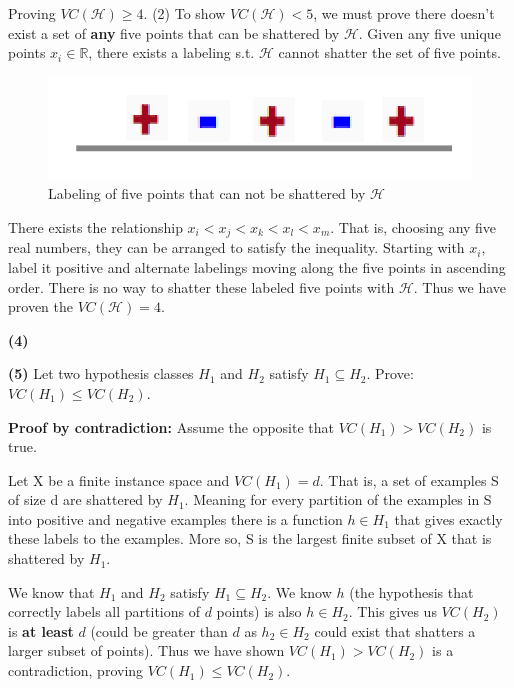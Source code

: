 \documentclass[11pt]{article}
\renewcommand\part[1]{\vspace{.10in}\textbf{(#1)}}
\begin{document}
Proving $VC(\mathcal{H}) \geq 4$. (2) To show $VC(\mathcal{H}) < 5$, we must prove there doesn't exist a set of \textbf{any} five points that can be shattered by $\mathcal{H}$. Given any five unique points $x_i \in \mathbb{R}$, there exists a labeling s.t. $\mathcal{H}$ cannot shatter the set of five points.

\begin{figure}[H]
  \centerline{\includegraphics[width=0.5\linewidth]{image_2_3_2.png}}
  \caption{Labeling of five points that can not be shattered by $\mathcal{H}$}
\end{figure}

There exists the relationship $x_i < x_j < x_k < x_l < x_m$. That is, choosing any five real numbers, they can be arranged to satisfy the inequality. Starting with $x_i$, label it positive and alternate labelings moving along the five points in ascending order. There is no way to shatter these labeled five points with $\mathcal{H}$. Thus we have proven the $VC(\mathcal{H}) = 4$.


\part{4}

\part{5} Let two hypothesis classes $H_1$ and $H_2$ satisfy $H_1 \subseteq H_2$. Prove: $VC(H_1) \leq VC(H_2)$.

\textbf{Proof by contradiction:} Assume the opposite that $VC(H_1) > VC(H_2)$ is true.

Let X be a finite instance space and $VC(H_1) = d$. That is, a set of examples S of size d are shattered by $H_1$. Meaning for every partition of the examples in S into positive and negative examples there is a function  $h \in H_1$ that gives exactly these labels to the examples. More so, S is the largest finite subset of X that is shattered by $H_1$.

We know that $H_1$ and $H_2$ satisfy $H_1 \subseteq H_2$. We know $h$ (the hypothesis that correctly labels all partitions of $d$ points) is also $h \in H_2$. This gives us $VC(H_2)$ is \textbf{at least} $d$ (could be greater than $d$ as $h_2 \in H_2$ could exist that shatters a larger subset of points). Thus we have shown $VC(H_1) > VC(H_2)$ is a contradiction, proving $VC(H_1) \leq VC(H_2)$.
\end{document}
